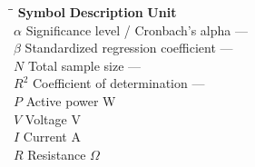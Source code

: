 
\begin{tabbing}
    \hspace{2.5cm}\= \hspace{8cm}\= \kill
    \textbf{Symbol} \> \textbf{Description} \> \textbf{Unit} \\[0.5\baselineskip]
    $\alpha$          \> Significance level / Cronbach's alpha \> — \\
    $\beta$           \> Standardized regression coefficient \> — \\
    $N$               \> Total sample size \> — \\
    $R^{2}$           \> Coefficient of determination \> — \\
    $P$               \> Active power \> W \\
    $V$               \> Voltage \> V \\
    $I$               \> Current \> A \\
    $R$               \> Resistance \> $\Omega$ \\
\end{tabbing}
